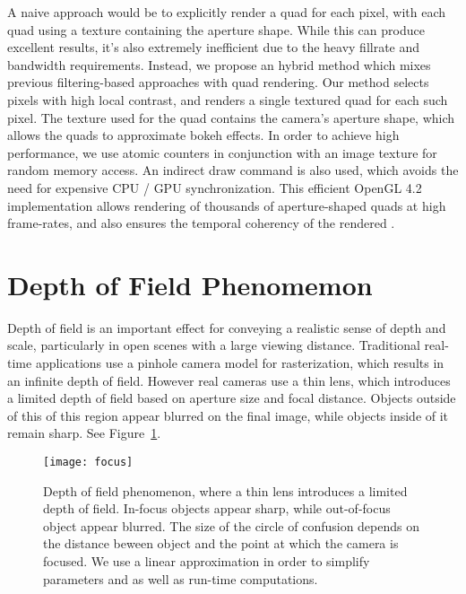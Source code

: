A naive approach would be to explicitly render a quad for each pixel, with each quad using a texture containing the aperture shape. While this can produce excellent results, it's also extremely inefficient due to the heavy fillrate and bandwidth requirements. Instead, we propose an hybrid method which mixes previous filtering-based approaches with quad rendering. Our method selects pixels with high local contrast, and renders a single textured quad for each such pixel. The texture used for the quad contains the camera's aperture shape, which allows the quads to approximate bokeh effects. In order to achieve high performance, we use atomic counters in conjunction with an image texture for random memory access. An indirect draw command is also used, which avoids the need for expensive CPU / GPU synchronization. This efficient OpenGL 4.2 implementation allows rendering of thousands of aperture-shaped quads at high frame-rates, and also ensures the temporal coherency of the rendered \bokeh.

\section{Depth of Field Phenomemon}\label{Derousiers:DOFPhenomenon}
Depth of field is an important effect for conveying a realistic sense of depth and scale, particularly in open scenes with a large viewing distance. Traditional real-time applications use a pinhole camera model for rasterization, which results in an infinite depth of field. However real cameras use a thin lens, which introduces a limited depth of field based on aperture size and focal distance. Objects outside of this of this region appear blurred on the final image, while objects inside of it remain sharp. See Figure~\ref{Derousiers:focus}.

	\begin{figure}[htb]\centering
	\texttt{[image: focus]}
	\caption{Depth of field phenomenon, where a thin lens introduces a limited depth of field. In-focus objects appear sharp, while out-of-focus object appear blurred. The size of the circle of confusion depends on the distance beween object and the point at which the camera is focused. We use a linear approximation in order to simplify parameters and as well as run-time computations. }
	\label{Derousiers:focus}
	\end{figure}


